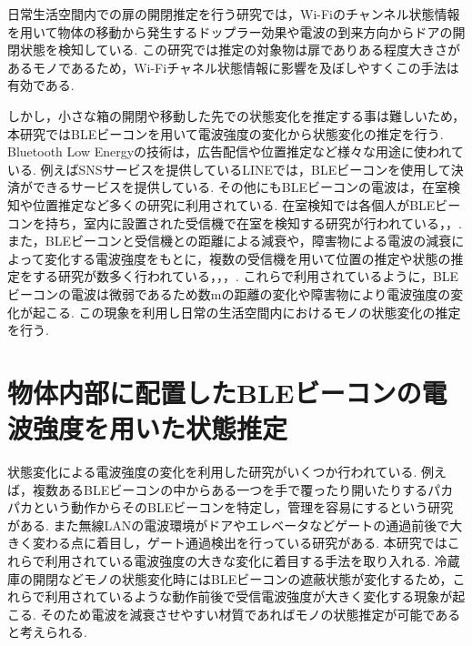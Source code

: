 \documentclass[Japanese]{dicomopapers}
\begin{document}
日常生活空間内での扉の開閉推定を行う研究\cite{WifiChannel}では，Wi-Fiのチャンネル状態情報を用いて物体の移動から発生するドップラー効果や電波の到来方向からドアの開閉状態を検知している.
この研究では推定の対象物は扉でありある程度大きさがあるモノであるため，Wi-Fiチャネル状態情報に影響を及ぼしやすくこの手法は有効である.

しかし，小さな箱の開閉や移動した先での状態変化を推定する事は難しいため，本研究ではBLEビーコンを用いて電波強度の変化から状態変化の推定を行う.
Bluetooth Low Energyの技術は，広告配信や位置推定など様々な用途に使われている.
例えばSNSサービスを提供しているLINEでは，BLEビーコンを使用して決済ができるサービスを提供している\cite{bleUse}.
その他にもBLEビーコンの電波は，在室検知や位置推定など多くの研究に利用されている.
在室検知では各個人がBLEビーコンを持ち，室内に設置された受信機で在室を検知する研究が行われている\cite{en-AreaUsed}，\cite{Finding_by_Counting}，\cite{dakoku_system}.
また，BLEビーコンと受信機との距離による減衰や，障害物による電波の減衰によって変化する電波強度をもとに，複数の受信機を用いて位置の推定や状態の推定をする研究が数多く行われている\cite{IoMT}，\cite{tandem}，\cite{blespot}，\cite{en-door}.%
これらで利用されているように，BLEビーコンの電波は微弱であるため数mの距離の変化や障害物により電波強度の変化が起こる.
この現象を利用し日常の生活空間内におけるモノの状態変化の推定を行う.










\section{物体内部に配置したBLEビーコンの電波強度を用いた状態推定}
状態変化による電波強度の変化を利用した研究がいくつか行われている.
例えば，複数あるBLEビーコンの中からある一つを手で覆ったり開いたりするパカパカという動作からそのBLEビーコンを特定し，管理を容易にするという研究がある\cite{BLEpkpk}.
また無線LANの電波環境がドアやエレベータなどゲートの通過前後で大きく変わる点に着目し，ゲート通過検出を行っている研究がある\cite{BLEpkpk}.
本研究ではこれらで利用されている電波強度の大きな変化に着目する手法を取り入れる.
冷蔵庫の開閉などモノの状態変化時にはBLEビーコンの遮蔽状態が変化するため，これらで利用されているような動作前後で受信電波強度が大きく変化する現象が起こる.
そのため電波を減衰させやすい材質であればモノの状態推定が可能であると考えられる.
\end{document}
